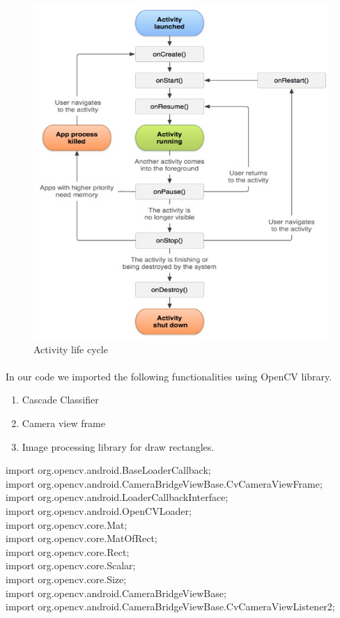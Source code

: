 \documentclass[11pt,a4paper,twoside]{report}
\begin{document}
\begin{appendix}
\begin{figure}[htpb]
\begin{center}
\includegraphics[scale=.6]{analysis}
\caption{Activity life cycle}

\end{center}
\end{figure}
\paragraph{ }In our code we imported the following functionalities using OpenCV library.
\begin{enumerate}
\item Cascade Classifier
\item Camera view frame
\item Image processing library for draw rectangles.

\end{enumerate}
\begin{flushleft}

import org.opencv.android.BaseLoaderCallback;\\
import org.opencv.android.CameraBridgeViewBase.CvCameraViewFrame;\\
import org.opencv.android.LoaderCallbackInterface;\\
import org.opencv.android.OpenCVLoader;\\
import org.opencv.core.Mat;\\
import org.opencv.core.MatOfRect;\\
import org.opencv.core.Rect;\\
import org.opencv.core.Scalar;\\
import org.opencv.core.Size;\\
import org.opencv.android.CameraBridgeViewBase;\\
import org.opencv.android.CameraBridgeViewBase.CvCameraViewListener2;


\end{flushleft}
\end{appendix}
\end{document}
